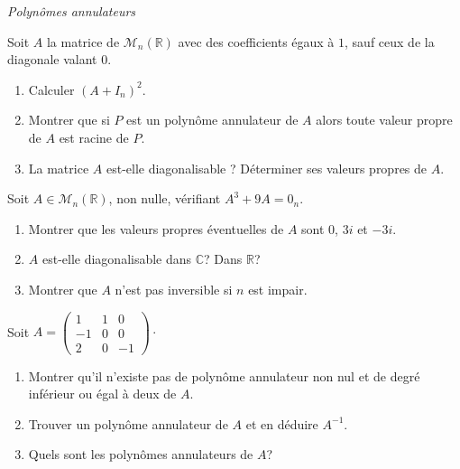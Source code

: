 \documentclass[a4paper,10pt]{report}
\begin{document}
\medskip

\begin{center}
\textit{{ {\large Polynômes annulateurs}}}
\end{center}

\medskip

\begin{Exa} Soit $A$ la matrice de $\mathcal{M}_n(\mathbb{R})$ avec des coefficients égaux à $1$, sauf ceux de la diagonale valant $0$.

\begin{enumerate}
\item Calculer $(A+I_n)^2$.
\item Montrer que si $P$ est un polynôme annulateur de $A$ alors toute valeur propre de $A$ est racine de $P$.
\item La matrice $A$ est-elle diagonalisable ? Déterminer ses valeurs propres de $A$. 
\end{enumerate}
\end{Exa}


\begin{Exa} Soit $A \in \mathcal{M}_n(\mathbb{R})$, non nulle, vérifiant $A^3+9A=0_n$.
\begin{enumerate}
\item Montrer que les valeurs propres éventuelles de $A$ sont $0$, $3i$ et $-3i$.
\item $A$ est-elle diagonalisable dans $\mathbb{C}$? Dans $\mathbb{R}$?
\item Montrer que $A$ n'est pas inversible si $n$ est impair. 
\end{enumerate}
\end{Exa}



\begin{Exa} Soit $A = \begin{pmatrix}
1 & 1 & 0 \\
-1 & 0 & 0 \\
2 & 0 & -1 
\end{pmatrix}\cdot$
\begin{enumerate}
\item Montrer qu'il n'existe pas de polynôme annulateur non nul et de degré inférieur ou égal à deux de $A$.
\item Trouver un polynôme annulateur de $A$ et en déduire $A^{-1}$.
\item Quels sont les polynômes annulateurs de $A$?
\end{enumerate}
\end{Exa}
\end{document}
